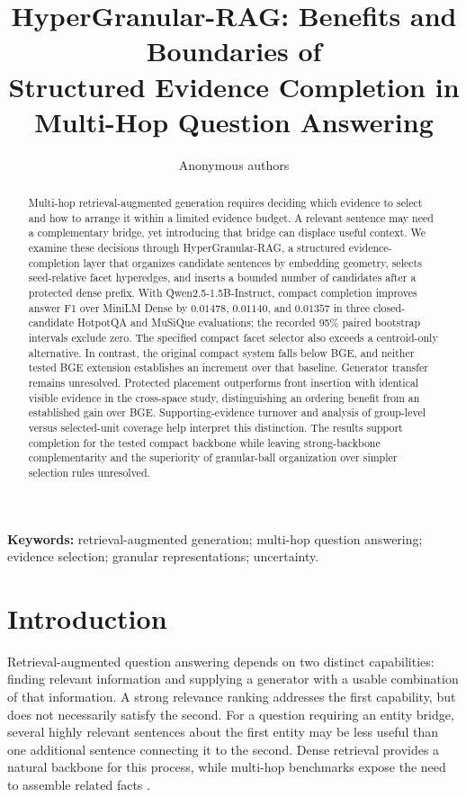 \documentclass[11pt,a4paper]{article}
\title{HyperGranular-RAG: Benefits and Boundaries of\\
Structured Evidence Completion in Multi-Hop Question Answering}
\author{Anonymous authors}
\date{}
\newcommand{\hgrag}{HyperGranular-RAG\xspace}
\begin{document}
\maketitle
\begin{abstract}
Multi-hop retrieval-augmented generation requires deciding which evidence
to select and how to arrange it within a limited evidence budget.
A relevant sentence may need a complementary bridge, yet introducing that
bridge can displace useful context. We examine these decisions through
\hgrag, a structured evidence-completion layer that organizes candidate
sentences by embedding geometry, selects seed-relative facet hyperedges,
and inserts a bounded number of candidates after a protected dense prefix.
With Qwen2.5-1.5B-Instruct, compact completion improves answer F1
over MiniLM Dense by $0.01478$, $0.01140$, and $0.01357$ in three
closed-candidate HotpotQA and MuSiQue evaluations; the recorded 95\%
paired bootstrap intervals exclude zero. The specified compact facet
selector also exceeds a centroid-only alternative. In contrast, the original
compact system falls below BGE, and neither tested BGE extension establishes
an increment over that baseline. Generator transfer remains unresolved.
Protected placement outperforms front insertion with identical visible
evidence in the cross-space study, distinguishing an ordering benefit from
an established gain over BGE. Supporting-evidence turnover and analysis of
group-level versus selected-unit coverage help interpret this distinction.
The results support completion for the tested compact backbone while
leaving strong-backbone complementarity and the superiority of granular-ball
organization over simpler selection rules unresolved.
\end{abstract}
\noindent\textbf{Keywords:} retrieval-augmented generation; multi-hop question
answering; evidence selection; granular representations; uncertainty.

\section{Introduction}
Retrieval-augmented question answering depends on two distinct capabilities:
finding relevant information and supplying a generator with a usable
combination of that information. A strong relevance ranking addresses the
first capability, but does not necessarily satisfy the second. For a question
requiring an entity bridge, several highly relevant sentences about the first
entity may be less useful than one additional sentence connecting it to the
second. Dense retrieval \citep{karpukhin2020dpr} provides a natural backbone
for this process, while multi-hop benchmarks expose the need to assemble
related facts \citep{yang2018hotpotqa,trivedi2022musique}.
\end{document}
